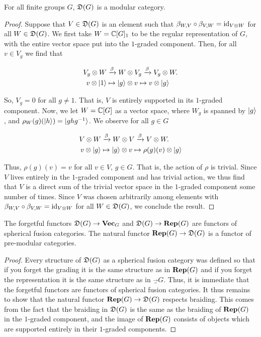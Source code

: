\begin{thrm} For all finite groups $G$, ${\mathfrak D}(G)$ is a modular category.
\end{thrm}
\begin{proof}
Suppose that $V\in {\mathfrak D}(G)$ is an element such that $\beta_{W,V}\circ\beta_{V,W}=\operatorname{id}_{V\otimes W}$ for all $W\in {\mathfrak D}(G)$. We first take $W={\mathbb C}[G]_1$ to be the regular representation of $G$, with the entire vector space put into the $1$-graded component. Then, for all $v\in V_g$ we find that

\begin{align*}
V_g\otimes W &\xrightarrow{\beta}W\otimes V_g\xrightarrow{\beta} V_g\otimes W.\\
v\otimes \ket{1}&\mapsto \ket{g}\otimes v \mapsto v\otimes \ket{g}
\end{align*}

So, $V_g=0$ for all $g\neq 1$. That is, $V$ is entirely supported in its $1$-graded component. Now, we let $W={\mathbb C}[G]$ as a vector space, where $W_g$ is spanned by $\ket{g}$, and $\rho_W(g)(\ket{h})=\ket{ghg^{-1}}$. We observe for all $g\in G$

\begin{align*}
V\otimes W &\xrightarrow{\beta}W\otimes V\xrightarrow{\beta} V\otimes W.\\
v\otimes \ket{g}&\mapsto \ket{g}\otimes v \mapsto \rho(g)(v)\otimes \ket{g}
\end{align*}

Thus, $\rho(g)(v)=v$  for all $v\in V$, $g\in G$. That is, the action of $\rho$ is trivial. Since $V$ lives entirely in the $1$-graded component and has trivial action, we thus find that $V$ is a direct sum of the trivial vector space in the $1$-graded component some number of times. Since $V$ was chosen arbitrarily among elements with $\beta_{W,V}\circ\beta_{V,W}=\operatorname{id}_{V\otimes W}$ for all $W\in {\mathfrak D}(G)$, we conclude the result.
\end{proof}

\begin{prop}The forgetful functors ${\mathfrak D}(G)\to {\bf Vec}_G$ and ${\mathfrak D}(G)\to{\bf Rep}(G)$ are functors of spherical fusion categories. The natural functor ${\bf Rep}(G)\to{\mathfrak D}(G)$ is a functor of pre-modular categories.
\end{prop}
\begin{proof} Every structure of ${\mathfrak D}(G)$ as a spherical fusion category was defined so that if you forget the grading it is the same structure as in ${\bf Rep}(G)$ and if you forget the representation it is the same structure as in $\Vec_G$. Thus, it is immediate that the forgetful functors are functors of spherical fusion categories. It thus remains to show that the natural functor ${\bf Rep}(G)\to{\mathfrak D}(G)$ respects braiding. This comes from the fact that the braiding in ${\mathfrak D}(G)$ is the same as the braiding of ${\bf Rep}(G)$ in the $1$-graded component, and the image  of ${\bf Rep}(G)$ consists of objects which are supported entirely in their $1$-graded components.
\end{proof}

